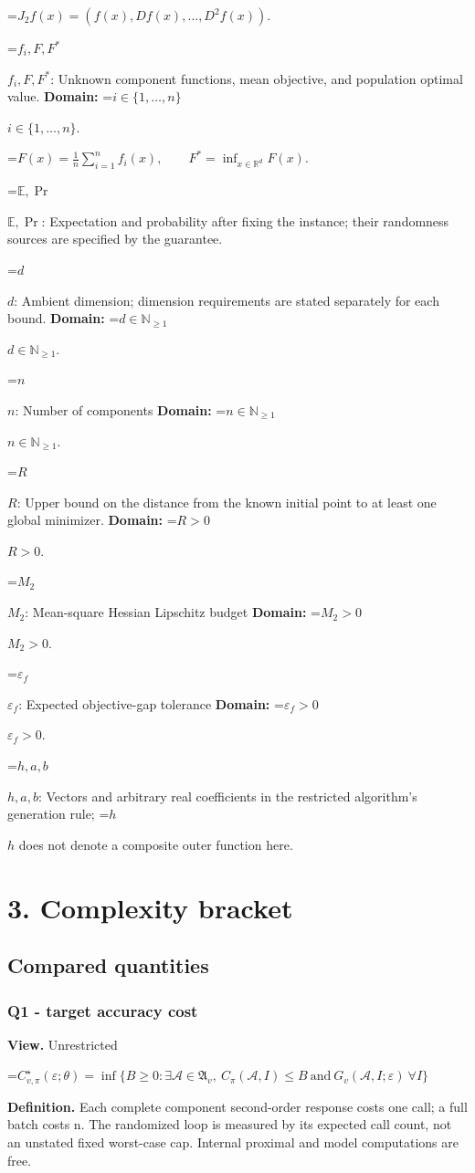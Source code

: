 \documentclass[10pt,a4paper]{article}
\newcommand{\AtlasMath}[1]{\par\begingroup\centering\setbox0=\hbox{$\displaystyle #1$}\ifdim\wd0>1.4\linewidth\typeout{ATLAS WIDE FORMULA: \the\wd0}\fi\ifdim\wd0>\linewidth\resizebox{\linewidth}{!}{\box0}\else\box0\fi\par\endgroup}
\newcommand{\AtlasInlineMath}[1]{\begingroup\setbox0=\hbox{$#1$}\ifdim\wd0>.4\linewidth\endgroup\AtlasMath{#1}\else\endgroup$#1$\fi}
\begin{document}
\AtlasMath{J_{2}f(x)=(f(x),Df(x),\ldots,D^{2}f(x)).}


\AtlasInlineMath{f_i,F,F^*}: Unknown component functions, mean objective, and population optimal value. \textbf{Domain:} \AtlasInlineMath{i\in\{1,\ldots,n\}}.


\AtlasMath{F(x)=\frac1n\sum_{i=1}^nf_i(x),\qquad F^*=\inf_{x\in\mathbb{R}^d}F(x).}


\AtlasInlineMath{\mathbb{E},\Pr}: Expectation and probability after fixing the instance; their randomness sources are specified by the guarantee.

\AtlasInlineMath{d}: Ambient dimension; dimension requirements are stated separately for each bound. \textbf{Domain:} \AtlasInlineMath{d\in\mathbb{N}_{\ge 1}}.

\AtlasInlineMath{n}: Number of components \textbf{Domain:} \AtlasInlineMath{n\in\mathbb{N}_{\ge 1}}.

\AtlasInlineMath{R}: Upper bound on the distance from the known initial point to at least one global minimizer. \textbf{Domain:} \AtlasInlineMath{R>0}.

\AtlasInlineMath{M_2}: Mean-square Hessian Lipschitz budget \textbf{Domain:} \AtlasInlineMath{M_2>0}.

\AtlasInlineMath{\varepsilon_f}: Expected objective-gap tolerance \textbf{Domain:} \AtlasInlineMath{\varepsilon_f>0}.

\AtlasInlineMath{h,a,b}: Vectors and arbitrary real coefficients in the restricted algorithm's generation rule; \AtlasInlineMath{h} does not denote a composite outer function here.

\section{3. Complexity bracket}
\subsection{Compared quantities}
\subsubsection{Q1 - target accuracy cost}
\textbf{View.} Unrestricted

\AtlasMath{C^\star_{v,\pi}(\varepsilon;\theta)=\inf\{B\ge0:\exists\mathcal A\in\mathfrak A_v,\ C_\pi(\mathcal A,I)\le B\ \text{and}\ G_v(\mathcal A,I;\varepsilon)\ \forall I\}}
\textbf{Definition.} Each complete component second-order response costs one call; a full batch costs n. The randomized loop is measured by its expected call count, not an unstated fixed worst-case cap. Internal proximal and model computations are free.
\end{document}
